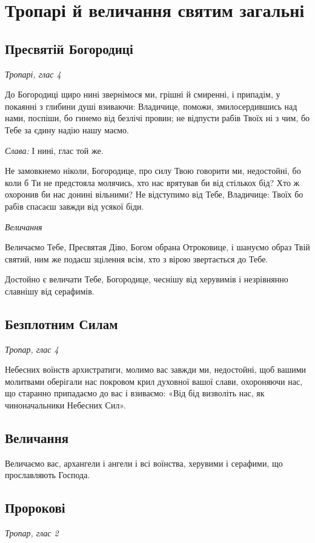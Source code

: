 \documentclass[chapters.tex]{subfiles}
\begin{document}
\chapter{Тропарі й величання святим загальні}
\section{Пресвятій Богородиці}
\emph{Тропарі, глас 4}

До Богородиці щиро нині звернімося ми, грішні й смиренні, і припадім, у покаянні з глибини душі взиваючи: Владичице, поможи, змилосердившись над нами, поспіши, бо гинемо від безлічі провин; не відпусти рабів Твоїх ні з чим, бо Тебе за єдину надію нашу маємо.

\emph{Слава:} І нині, глас той же.

Не замовкнемо ніколи, Богородице, про силу Твою говорити ми, недостойні, бо коли б Ти не предстояла молячись, хто нас врятував би від стількох бід? Хто ж охоронив би нас донині вільними? Не відступимо від Тебе, Владичице: Твоїх бо рабів спасаєш завжди від усякої біди.

\emph{Величання}

Величаємо Тебе, Пресвятая Діво, Богом обрана Отроковице, і шануємо образ Твій святий, ним же подаєш зцілення всім, хто з вірою звертається до Тебе.

Достойно є величати Тебе, Богородице, чеснішу від херувимів і незрівнянно славнішу від серафимів.

\section{Безплотним Силам}
\emph{Тропар, глас 4}

Небесних воїнств архистратиги, молимо вас завжди ми, недостойні, щоб вашими молитвами оберігали нас покровом крил духовної вашої слави, охороняючи нас, що старанно припадаємо до вас і взиваємо: «Від бід визволіть нас, як чиноначальники Небесних Сил».

\section{Величання}

Величаємо вас, архангели і ангели і всі воїнства, херувими і серафими, що прославляють Господа.

\section{Пророкові}
\emph{Тропар, глас 2}
\end{document}
